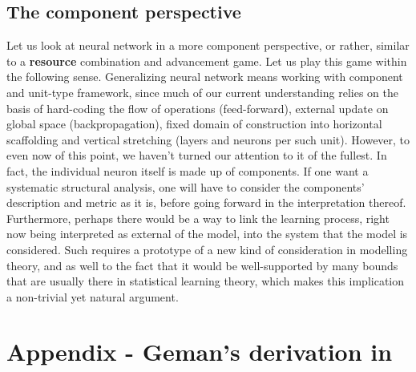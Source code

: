 \documentclass[10pt]{article} %
\begin{document}
\clearpage

\subsection{The component perspective}

Let us look at neural network in a more component perspective, or rather, similar to a \textbf{resource} combination and advancement game. Let us play this game within the following sense. Generalizing neural network means working with component and unit-type framework, since much of our current understanding relies on the basis of hard-coding the flow of operations (feed-forward), external update on global space (backpropagation), fixed domain of construction into horizontal scaffolding and vertical stretching (layers and neurons per such unit). However, to even now of this point, we haven't turned our attention to it of the fullest. In fact, the individual neuron itself is made up of components. If one want a systematic structural analysis, one will have to consider the components' description and metric as it is, before going forward in the interpretation thereof. Furthermore, perhaps there would be a way to link the learning process, right now being interpreted as external of the model, into the system that the model is considered. Such requires a prototype of a new kind of consideration in modelling theory, and as well to the fact that it would be well-supported by many bounds that are usually there in statistical learning theory, which makes this implication a non-trivial yet natural argument.



\clearpage

{
    \small
    
    
}

\clearpage
\section*{Appendix - Geman's derivation in \cite{6797087}}
\end{document}

